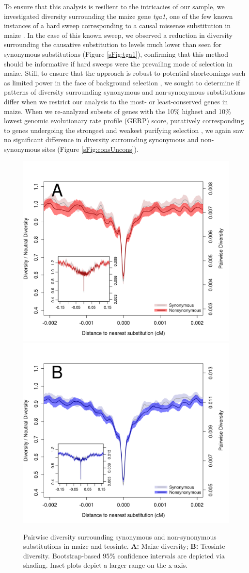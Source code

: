 \documentclass{pnastwo}
\begin{document}
\begin{article}
To ensure that this analysis is resilient to the intricacies of our sample, we investigated diversity surrounding the maize gene \emph{tga1}, one of the few known instances of a hard sweep corresponding to a causal missense substitution in maize \cite{wang2015}. In the case of this known sweep, we observed a reduction in diversity surrounding the causative substitution to levels much lower than seen for synonymous substitutions (Figure \ref{sFig:tga1}), confirming that this method should be informative if hard sweeps were the prevailing mode of selection in maize. Still, to ensure that the approach is robust to potential shortcomings such as limited power in the face of background selection \cite{enard2014}, we sought to determine if patterns of diversity surrounding synonymous and non-synonymous substitutions differ when we restrict our analysis to the most- or least-conserved genes in maize. When we re-analyzed subsets of genes with the 10\% highest and 10\% lowest genomic evolutionary rate profile (GERP) score, putatively corresponding to genes undergoing the strongest and weakest purifying selection \cite{davydov2010, cooper2005, rodgers2015}, we again saw no significant difference in diversity surrounding synonymous and non-synonymous sites (Figure \ref{sFig:consUncons}).

\begin{figure}[!htb]
\centering
\includegraphics[width=.45\textwidth]{FigsAndFiles/plotDiversity_TvM_Folded2_Significance_Aug}
\hspace{0.05\textwidth} \includegraphics[width=.45\textwidth]{FigsAndFiles/plotDiversity_TvT_Folded2_Significance_Aug}
\caption{Pairwise diversity surrounding synonymous and non-synonymous
  substitutions in maize and teosinte. {\bf A:} Maize diversity; {\bf B:} Teosinte
diversity. Bootstrap-based 95\% confidence intervals are depicted via shading. Inset plots depict a larger range on the x-axis. \label{fig:hardSweeps}}
\end{figure}



\end{article}
\end{document}
